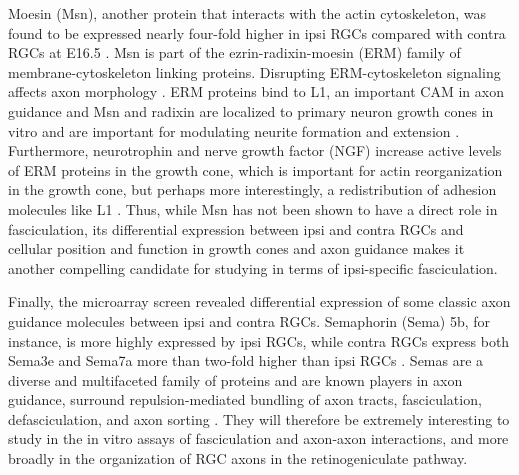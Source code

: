 Moesin (Msn), another protein that interacts with the actin cytoskeleton, was found to be expressed nearly four-fold higher in ipsi RGCs compared with contra RGCs at E16.5 \cite{wang2016ipsilateral}.
Msn is part of the ezrin-radixin-moesin (ERM) family of membrane-cytoskeleton linking proteins.
Disrupting ERM-cytoskeleton signaling affects axon morphology \cite{dickson2002functional,marsick2012activation}.
ERM proteins bind to L1, an important CAM in axon guidance \cite{dickson2002functional,marsick2012activation} and Msn and radixin are localized to primary neuron growth cones in vitro and are important for modulating neurite formation and extension \cite{paglini1998suppression}.
Furthermore, neurotrophin and nerve growth factor (NGF) increase active levels of ERM proteins in the growth cone, which is important for actin reorganization in the growth cone, but perhaps more interestingly, a redistribution of adhesion molecules like L1 \cite{marsick2012activation}.
Thus, while Msn has not been shown to have a direct role in fasciculation, its differential expression between ipsi and contra RGCs and cellular position and function in growth cones and axon guidance makes it another compelling candidate for studying in terms of ipsi-specific fasciculation.

Finally, the microarray screen revealed differential expression of some classic axon guidance molecules between ipsi and contra RGCs.
Semaphorin (Sema) 5b, for instance, is more highly expressed by ipsi RGCs, while contra RGCs express both Sema3e and Sema7a more than two-fold higher than ipsi RGCs \cite{wang2016ipsilateral}.
Semas are a diverse and multifaceted family of proteins and are known players in axon guidance, surround repulsion-mediated bundling of axon tracts, fasciculation, defasciculation, and axon sorting \cite{kuwajima2012optic,tran2007semaphorin,kolodkin2011mechanisms,zhou2013axon,imai2009pre}.
They will therefore be extremely interesting to study in the in vitro assays of fasciculation and axon-axon interactions, and more broadly in the organization of RGC axons in the retinogeniculate pathway.


